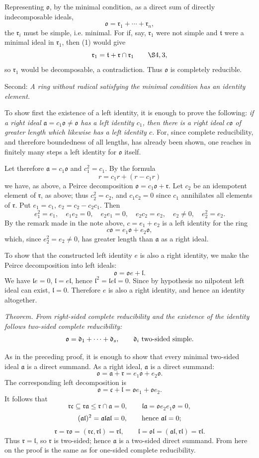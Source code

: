\documentclass[11pt]{article}
\providecommand{\mo}{\mathfrak{o}}
\providecommand{\ma}{\mathfrak{a}}
\providecommand{\mc}{\mathfrak{c}}
\providecommand{\md}{\mathfrak{d}}
\providecommand{\ml}{\mathfrak{l}}
\providecommand{\mr}{\mathfrak{r}}
\providecommand{\mt}{\mathfrak{t}}
\begin{document}
Representing $\mo$, by the minimal condition, as a direct sum of directly indecomposable ideals,
\[
        \mo=\mr_1+\cdots+\mr_n,
\]
the $\mr_i$ must be simple, i.e. minimal. For if, say, $\mr_1$ were not simple and $\mt$ were a minimal ideal in $\mr_1$, then (1) would give
\[
        \mr_1=\mt+\mr\cap\mr_1 \qquad \hbox{\(\S 4,3\)},
\]
so $\mr_1$ would be decomposable, a contradiction. Thus $\mo$ is completely reducible.

Second: \emph{A ring without radical satisfying the minimal condition has an identity element.}

To show first the existence of a left identity, it is enough to prove the following: \emph{if a right ideal $\ma=c_1\mo\ne\mo$ has a left identity $c_1$, then there is a right ideal $c\mo$ of greater length which likewise has a left identity $c$.} For, since complete reducibility, and therefore boundedness of all lengths, has already been shown, one reaches in finitely many steps a left identity for $\mo$ itself.

Let therefore $\ma=c_1\mo$ and $c_1^2=c_1$. By the formula
\[
        r=c_1r+(r-c_1r)
\]
we have, as above, a Peirce decomposition $\mo=c_1\mo+\mr$. Let $c_2$ be an idempotent element of $\mr$, as above; thus $c_2^2=c_2$, and $c_1c_2=0$ since $c_1$ annihilates all elements of $\mr$. Put $e_1=c_1$, $e_2=c_2-c_2c_1$. Then
\[
        e_1^2=e_1,
        \quad e_1e_2=0,
        \quad e_2e_1=0,
        \quad e_2c_2=e_2,
        \quad e_2\ne0,
        \quad e_2^2=e_2.
\]
By the remark made in the note above, $c=e_1+e_2$ is a left identity for the ring
\[
        c\mo=e_1\mo+e_2\mo,
\]
which, since $e_2^2=e_2\ne0$, has greater length than $\ma$ as a right ideal.

To show that the constructed left identity $e$ is also a right identity, we make the Peirce decomposition into left ideals:
\[
        \mo=\mo e+\ml.
\]
We have $\ml e=0$, $\ml=e\ml$, hence $\ml^2=\ml e\ml=0$. Since by hypothesis no nilpotent left ideal can exist, $\ml=0$. Therefore $e$ is also a right identity, and hence an identity altogether.

\emph{Theorem. From right-sided complete reducibility and the existence of the identity follows two-sided complete reducibility:}
\[
        \mo=\md_1+\cdots+\md_s,
        \qquad \md_i \hbox{ two-sided simple.}
\]

As in the preceding proof, it is enough to show that every minimal two-sided ideal $\ma$ is a direct summand. As a right ideal, $\ma$ is a direct summand:
\[
        \mo=\ma+\mr=e_1\mo+e_2\mo.
\]
The corresponding left decomposition is
\[
        \mo=\mc+\ml=\mo e_1+\mo e_2.
\]
It follows that
\[
        \mr\mc\subseteq \mr\ma\leq \mr\cap\ma=0,
        \qquad
        \ml\ma=\mo e_2e_1\mo=0,
\]
\[
        (\ma\ml)^2=\ma\ml\ma\ml=0,
        \qquad \hbox{hence } \ma\ml=0;
\]
\[
        \mr=\mr\mo=(\mr\mc,\mr\ml)=\mr\ml,
        \qquad
        \ml=\mo\ml=(\ma\ml,\mr\ml)=\mr\ml.
\]
Thus $\mr=\ml$, so $\mr$ is two-sided; hence $\ma$ is a two-sided direct summand. From here on the proof is the same as for one-sided complete reducibility.
\end{document}
